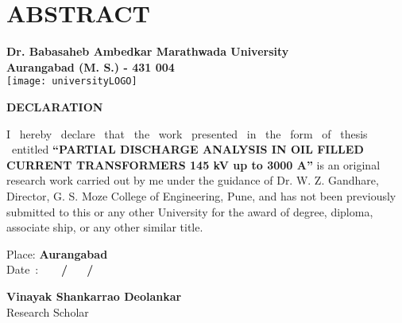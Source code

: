 \clearpage
\chapter*{ABSTRACT}

\clearpage

\begin{center}
\large \textbf{Dr. Babasaheb Ambedkar Marathwada University\\
Aurangabad (M. S.) - 431 004}\\
\vspace{0.5cm}
\texttt{[image: universityLOGO]}\\
\vspace{0.5cm}
\textbf{\large DECLARATION}\\
\end{center}

\normalsize I ~hereby ~declare ~that ~the ~work ~presented ~in ~the ~form ~of ~thesis ~entitled \textbf{\textquotedblleft PARTIAL DISCHARGE ANALYSIS IN OIL FILLED CURRENT TRANSFORMERS 145 kV up to 3000 A\textquotedblright} is an original research work carried out by me under the guidance of Dr. W. Z. Gandhare, Director, G. S. Moze College of Engineering, Pune, and has not been previously submitted to this or any other University for the award of degree, diploma, associate ship, or any other similar title.

\vspace{0.5cm}
Place: \textbf{Aurangabad}\\
Date~: \textbf{~~~/~~~/}\\

\hspace{2.2in}
\begin{minipage}{4in}
\vspace{0.5in}
\begin{center}
\textbf{Vinayak Shankarrao Deolankar}\\
Research Scholar
\end{center}

\end{minipage}
\clearpage

